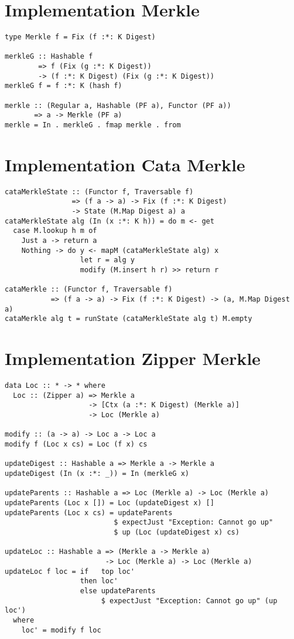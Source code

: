 \section{Implementation Merkle}
\label{app-impl-merkle}
\begin{verbatim}
type Merkle f = Fix (f :*: K Digest)

merkleG :: Hashable f 
        => f (Fix (g :*: K Digest)) 
        -> (f :*: K Digest) (Fix (g :*: K Digest))
merkleG f = f :*: K (hash f)

merkle :: (Regular a, Hashable (PF a), Functor (PF a)) 
       => a -> Merkle (PF a)
merkle = In . merkleG . fmap merkle . from
\end{verbatim}

\section{Implementation Cata Merkle}
\label{app-impl-cata-merkle}
\begin{verbatim}
cataMerkleState :: (Functor f, Traversable f)
                => (f a -> a) -> Fix (f :*: K Digest) 
                -> State (M.Map Digest a) a
cataMerkleState alg (In (x :*: K h)) = do m <- get
  case M.lookup h m of
    Just a -> return a
    Nothing -> do y <- mapM (cataMerkleState alg) x
                  let r = alg y
                  modify (M.insert h r) >> return r

cataMerkle :: (Functor f, Traversable f)
           => (f a -> a) -> Fix (f :*: K Digest) -> (a, M.Map Digest a)
cataMerkle alg t = runState (cataMerkleState alg t) M.empty
\end{verbatim}

\section{Implementation Zipper Merkle}
\label{app-impl-zipper-merkle}
\begin{verbatim}
data Loc :: * -> * where
  Loc :: (Zipper a) => Merkle a 
                    -> [Ctx (a :*: K Digest) (Merkle a)] 
                    -> Loc (Merkle a)

modify :: (a -> a) -> Loc a -> Loc a
modify f (Loc x cs) = Loc (f x) cs

updateDigest :: Hashable a => Merkle a -> Merkle a
updateDigest (In (x :*: _)) = In (merkleG x)

updateParents :: Hashable a => Loc (Merkle a) -> Loc (Merkle a)
updateParents (Loc x []) = Loc (updateDigest x) []
updateParents (Loc x cs) = updateParents
                          $ expectJust "Exception: Cannot go up"
                          $ up (Loc (updateDigest x) cs)

updateLoc :: Hashable a => (Merkle a -> Merkle a) 
                        -> Loc (Merkle a) -> Loc (Merkle a)
updateLoc f loc = if   top loc'
                  then loc'
                  else updateParents 
                       $ expectJust "Exception: Cannot go up" (up loc')
  where
    loc' = modify f loc
\end{verbatim}

